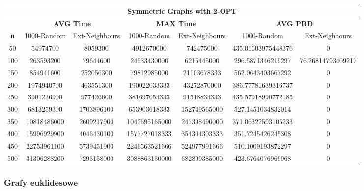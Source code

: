 \documentclass{article}
\begin{document}
\begin{center}
\begin{tabular}{|c|c|c|c|c|c|c|}
\hline
\multicolumn{7}{|c|}{\textbf{Symmetric Graphs with 2-OPT}}\\
\hline
 & \multicolumn{2}{|c|}{\textbf{AVG Time}} & \multicolumn{2}{|c|}{\textbf{MAX Time}} & \multicolumn{2}{|c|}{\textbf{AVG PRD}}\\
\hline
\textbf{n} & 1000-Random & Ext-Neighbours & 1000-Random & Ext-Neighbours & 1000-Random & Ext-Neighbours\\
\hline
50 & 54974700 & 8059300 & 4912670000 & 742475000 & 435.01603975448376 & 0\\
\hline
100 & 263593200 & 79644600 & 24933430000 & 6215445000 & 296.5871346219297 & 76.26814793409217\\
\hline
150 & 854941600 & 252056300 & 79812985000 & 21103678333 & 562.0643403667292 & 0\\
\hline
200 & 1974940700 & 463551300 & 190022033333 & 43272870000 & 386.77781639316737 & 0\\
\hline
250 & 3901226900 & 977426600 & 381697053333 & 91518833333 & 435.57918990772185 & 0\\
\hline
300 & 6813259300 & 1703896100 & 653903618333 & 152749565000 & 527.1451034832014 & 0\\
\hline
350 & 10818486000 & 2609217900 & 1042695165000 & 247398490000 & 371.06322593105233 & 0\\
\hline
400 & 15996929900 & 4046430100 & 1577727018333 & 354304303333 & 351.7245426245308 & 0\\
\hline
450 & 22753961100 & 5739451900 & 2246563521666 & 524977991666 & 510.1009193872297 & 0\\
\hline
500 & 31306288200 & 7293158000 & 3088863130000 & 682899385000 & 423.6764076969968 & 0\\
\hline
\end{tabular}
\end{center}


\subsubsection{Grafy euklidesowe}
\end{document}
